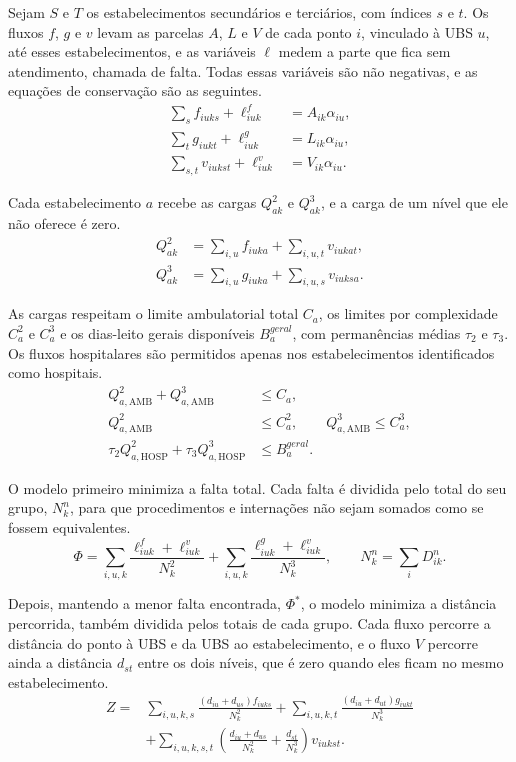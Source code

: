 \documentclass[12pt,a4paper,oneside]{report}
\begin{document}
Sejam $S$ e $T$ os estabelecimentos secundários e terciários, com índices $s$ e $t$. Os fluxos $f$, $g$ e
$v$ levam as parcelas $A$, $L$ e $V$ de cada ponto $i$, vinculado à UBS $u$, até esses estabelecimentos, e as variáveis $\ell$ medem a parte que
fica sem atendimento, chamada de falta. Todas essas variáveis são não negativas, e as equações de
conservação são as seguintes.
\begin{align}
\sum_s f_{iuks}+\ell^f_{iuk}&=A_{ik}\alpha_{iu},\\
\sum_t g_{iukt}+\ell^g_{iuk}&=L_{ik}\alpha_{iu},\\
\sum_{s,t}v_{iukst}+\ell^v_{iuk}&=V_{ik}\alpha_{iu}.
\end{align}

Cada estabelecimento $a$ recebe as cargas $Q^2_{ak}$ e $Q^3_{ak}$, e a carga de um nível que ele não
oferece é zero.
\begin{align}
Q^2_{ak}&=\sum_{i,u}f_{iuka}+\sum_{i,u,t}v_{iukat},\\
Q^3_{ak}&=\sum_{i,u}g_{iuka}+\sum_{i,u,s}v_{iuksa}.
\end{align}

As cargas respeitam o limite ambulatorial total $C_a$, os limites por complexidade $C_a^2$ e $C_a^3$ e os
dias-leito gerais disponíveis $B_a^{geral}$, com permanências médias $\tau_2$ e $\tau_3$.
Os fluxos hospitalares são permitidos apenas nos estabelecimentos identificados como hospitais.
\begin{align}
Q^2_{a,\mathrm{AMB}}+Q^3_{a,\mathrm{AMB}}&\leq C_a,\\
Q^2_{a,\mathrm{AMB}}&\leq C_a^2,\qquad Q^3_{a,\mathrm{AMB}}\leq C_a^3,\\
\tau_2Q^2_{a,\mathrm{HOSP}}+\tau_3Q^3_{a,\mathrm{HOSP}}&\leq B_a^{geral}.
\end{align}

O modelo primeiro minimiza a falta total. Cada falta é dividida pelo total do seu grupo, $N^n_k$, para que
procedimentos e internações não sejam somados como se fossem equivalentes.
\begin{equation}
\Phi=\sum_{i,u,k}\frac{\ell^f_{iuk}+\ell^v_{iuk}}{N^2_k}
+\sum_{i,u,k}\frac{\ell^g_{iuk}+\ell^v_{iuk}}{N^3_k},\qquad N^n_k=\sum_iD^n_{ik}.
\end{equation}

Depois, mantendo a menor falta encontrada, $\Phi^*$, o modelo minimiza a distância percorrida, também
dividida pelos totais de cada grupo. Cada fluxo percorre a distância do ponto à UBS e da UBS ao
estabelecimento, e o fluxo $V$ percorre ainda a distância $d_{st}$ entre os dois níveis, que é zero quando
eles ficam no mesmo estabelecimento.
\begin{align}
Z={}&\sum_{i,u,k,s}\frac{(d_{iu}+d_{us})f_{iuks}}{N^2_k}
+\sum_{i,u,k,t}\frac{(d_{iu}+d_{ut})g_{iukt}}{N^3_k}\nonumber\\
&+\sum_{i,u,k,s,t}\left(\frac{d_{iu}+d_{us}}{N^2_k}+\frac{d_{st}}{N^3_k}\right)v_{iukst}.
\end{align}
\end{document}
